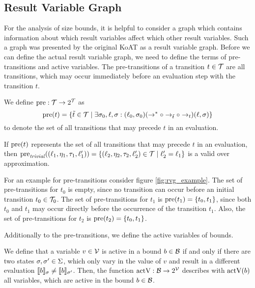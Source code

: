 \subsection{Result Variable Graph}

For the analysis of size bounds, it is helpful to consider a graph which contains information about which result variables affect which other result variables.
Such a graph was presented by the original KoAT \cite{koat} as a result variable graph.
Before we can define the actual result variable graph, we need to define the terms of pre-transitions and active variables.
The pre-transitions of a transition $t \in \mathcal{T}$ are all transitions, which may occur immediately before an evaluation step with the transition $t$.

\begin{definition} 
  We define $\text{pre}: \mathcal{T} \rightarrow 2^{\mathcal{T}}$ as
  \[\text{pre}(t) = \lbrace \tilde{t} \in \mathcal{T} \mid \exists \sigma_0, \ell, \sigma: (\ell_0, \sigma_0) (\rightarrow^* \circ \rightarrow_{\tilde{t}} \circ \rightarrow_{t}) (\ell, \sigma) \rbrace\]
  to denote the set of all transitions that may precede $t$ in an evaluation.	
\end{definition}

If $\text{pre}(t)$ represents the set of all transitions that may precede $t$ in an evaluation, then $\text{pre}_{\mathit{trivial}}((\ell_1, \eta_1, \tau_1, \ell_1')) = \lbrace (\ell_2, \eta_2, \tau_2, \ell_2') \in \mathcal{T} \mid \ell_2' = \ell_1 \rbrace$ is a valid over approximation.



For an example for pre-transitions consider figure \ref{fig:rvg_example}.
The set of pre-transitions for $t_0$ is empty, since no transition can occur before an initial transition $t_0 \in \mathcal{T}_0$.
The set of pre-transitions for $t_1$ is $\text{pre}(t_1) = \lbrace t_0, t_1 \rbrace$, since both $t_0$ and $t_1$ may occur directly before the occurrence of the transition $t_1$.
Also, the set of pre-transitions for $t_2$ is $\text{pre}(t_2) = \lbrace t_0, t_1 \rbrace$.

Additionally to the pre-transitions, we define the active variables of bounds. 

\begin{definition} 
  We define that a variable $v \in \mathcal{V}$ is active in a bound $b \in \mathcal{B}$ if and only if there are two states $\sigma, \sigma' \in \Sigma$, which only vary in the value of $v$ and result in a different evaluation $\llbracket b \rrbracket_{\sigma} \neq \llbracket b \rrbracket_{\sigma'}$.
  Then, the function $\text{actV}: \mathcal{B} \rightarrow 2^{\mathcal{V}}$ describes with $\text{actV}(b)$ all variables, which are active in the bound $b \in \mathcal{B}$.
\end{definition}

